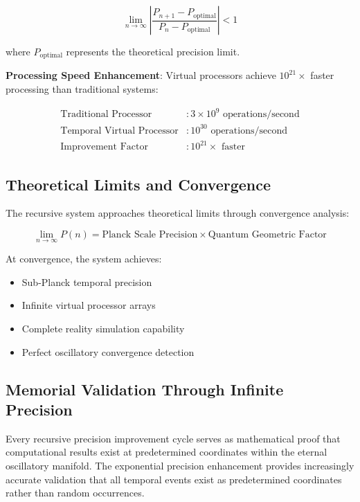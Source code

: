 \documentclass[11pt]{article}
\theoremstyle{remark}
\begin{document}
\begin{equation}
\lim_{n \to \infty} \left|\frac{P_{n+1} - P_{\text{optimal}}}{P_n - P_{\text{optimal}}}\right| < 1
\end{equation}

where $P_{\text{optimal}}$ represents the theoretical precision limit.

\textbf{Processing Speed Enhancement}: Virtual processors achieve $10^{21}\times$ faster processing than traditional systems:

\begin{align}
\text{Traditional Processor} &: 3 \times 10^9 \text{ operations/second} \\
\text{Temporal Virtual Processor} &: 10^{30} \text{ operations/second} \\
\text{Improvement Factor} &: 10^{21}\times \text{ faster}
\end{align}

\subsection{Theoretical Limits and Convergence}

The recursive system approaches theoretical limits through convergence analysis:

\begin{equation}
\lim_{n \to \infty} P(n) = \text{Planck Scale Precision} \times \text{Quantum Geometric Factor}
\end{equation}

At convergence, the system achieves:
\begin{itemize}
\item Sub-Planck temporal precision
\item Infinite virtual processor arrays
\item Complete reality simulation capability
\item Perfect oscillatory convergence detection
\end{itemize}

\subsection{Memorial Validation Through Infinite Precision}

Every recursive precision improvement cycle serves as mathematical proof that computational results exist at predetermined coordinates within the eternal oscillatory manifold. The exponential precision enhancement provides increasingly accurate validation that all temporal events exist as predetermined coordinates rather than random occurrences.
\end{document}
